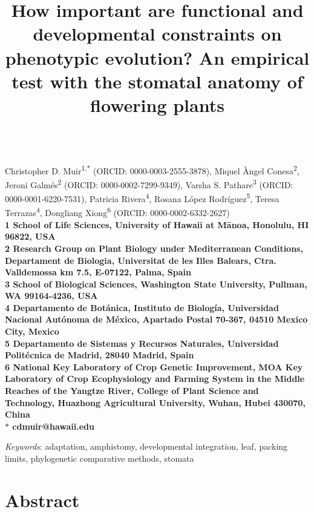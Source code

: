 \documentclass[
  12pt,
]{article}
\title{How important are functional and developmental constraints on phenotypic evolution? An empirical test with the stomatal anatomy of flowering plants}
\author{}
\date{\vspace{-2.5em}}
\author{}
\date{}
\begin{document}
\begin{flushleft}
{\Large
\textbf{}
}
\newline
\\
Christopher D. Muir\textsuperscript{1,*} (ORCID: 0000-0003-2555-3878),
Miquel \`{A}ngel Conesa\textsuperscript{2},
Jeroni Galm\'{e}s\textsuperscript{2} (ORCID: 0000-0002-7299-9349),
Varsha S. Pathare\textsuperscript{3} (ORCID: 0000-0001-6220-7531),
Patricia Rivera\textsuperscript{4},
Rosana López Rodríguez\textsuperscript{5},
Teresa Terrazas\textsuperscript{4},
Dongliang Xiong\textsuperscript{6} (ORCID: 0000-0002-6332-2627)
\\
\bigskip
\bf{1} School of Life Sciences, University of Hawaii at M\=anoa, Honolulu, HI 96822, USA \\
\bf{2} Research Group on Plant Biology under Mediterranean Conditions, Departament de Biologia, Universitat de les Illes Balears, Ctra. Valldemossa km 7.5, E-07122, Palma, Spain \\
\bf{3} School of Biological Sciences, Washington State University, Pullman, WA 99164-4236, USA \\
\bf{4} Departamento de Botánica, Instituto de Biología, Universidad Nacional Autónoma de México, Apartado Postal 70‑367, 04510 Mexico City, Mexico \\
\bf{5} Departamento de Sistemas y Recursos Naturales, Universidad Politécnica de Madrid, 28040 Madrid, Spain \\
\bf{6} National Key Laboratory of Crop Genetic Improvement, MOA Key Laboratory of Crop Ecophysiology and Farming System in the Middle Reaches of the Yangtze River, College of Plant Science and Technology, Huazhong Agricultural University, Wuhan, Hubei 430070, China\\
\bigskip
$\ast$ cdmuir@hawaii.edu

\textit{Keywords}: adaptation, amphistomy, developmental integration, leaf, packing limits, phylogenetic comparative methods, stomata

\end{flushleft}

\newpage{}

\hypertarget{abstract}{%
\section{Abstract}\label{abstract}}
\end{document}
